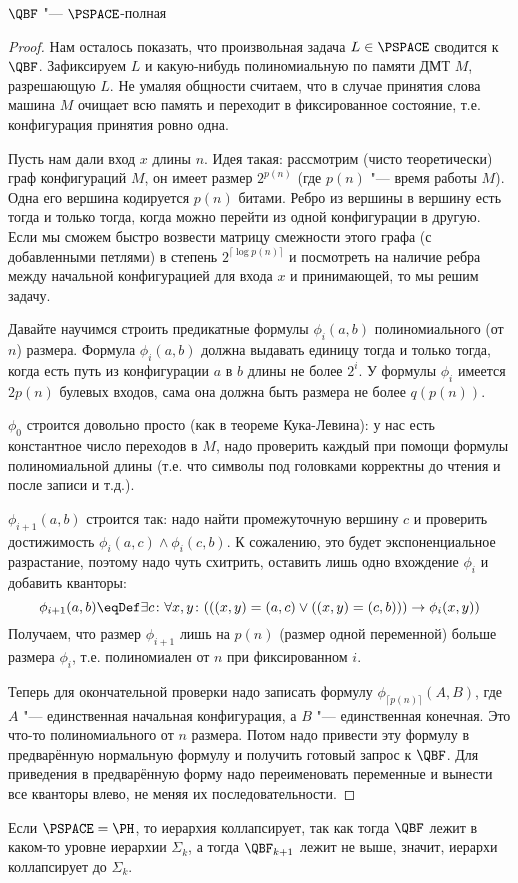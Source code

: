 	\begin{theorem}
		$\QBF$ "--- $\PSPACE$-полная
	\end{theorem}
	\begin{proof}
		Нам осталось показать, что произвольная задача $L \in \PSPACE$ сводится к $\QBF$.
		Зафиксируем $L$ и какую-нибудь полиномиальную по памяти ДМТ $M$, разрешающую $L$.
		Не умаляя общности считаем, что в случае принятия слова машина $M$ очищает всю память
		и переходит в фиксированное состояние, т.е. конфигурация принятия ровно одна.

		Пусть нам дали вход $x$ длины $n$.
		Идея такая: рассмотрим (чисто теоретически) граф конфигураций $M$, он имеет размер $2^{p(n)}$ (где $p(n)$ "--- время работы $M$).
		Одна его вершина кодируется $p(n)$ битами.
		Ребро из вершины в вершину есть тогда и только тогда, когда можно перейти из одной конфигурации в другую.
		Если мы сможем быстро возвести матрицу смежности этого графа (с добавленными петлями) в степень $2^{\lceil\log p(n)\rceil}$
		и посмотреть на наличие ребра между начальной конфигурацией для входа $x$ и принимающей, то мы решим задачу.

		Давайте научимся строить предикатные формулы $\phi_i(a, b)$ полиномиального (от $n$) размера.
		Формула $\phi_i(a, b)$ должна выдавать единицу тогда и только тогда, когда есть путь
		из конфигурации $a$ в $b$ длины не более $2^i$.
		У формулы $\phi_i$ имеется $2p(n)$ булевых входов, сама она должна быть размера не более $q(p(n))$.

		$\phi_0$ строится довольно просто (как в теореме Кука-Левина): у нас есть константное число переходов
		в $M$, надо проверить каждый при помощи формулы полиномиальной длины (т.е. что символы под головками корректны до чтения и после записи и т.д.).

		$\phi_{i+1}(a, b)$ строится так: надо найти промежуточную вершину $c$ и проверить
		достижимость $\phi_i(a, c) \land \phi_i(c, b)$.
		К сожалению, это будет экспоненциальное разрастание, поэтому надо чуть схитрить, оставить лишь одно вхождение $\phi_i$
		и добавить кванторы:
		\[ \phi_{i+1}(a, b) \eqDef \exists c \colon \forall x, y \colon (((x, y) = (a, c) \lor ((x, y) = (c, b))) \to \phi_i(x, y))\]
		Получаем, что размер $\phi_{i+1}$ лишь на $p(n)$ (размер одной переменной) больше размера $\phi_i$, т.е. полиномиален от $n$ при фиксированном $i$.

		Теперь для окончательной проверки надо записать формулу $\phi_{\lceil p(n) \rceil}(A, B)$,
		где $A$ "--- единственная начальная конфигурация, а $B$ "--- единственная конечная.
		Это что-то полиномиального от $n$ размера.
		Потом надо привести эту формулу в предварённую нормальную формулу и получить готовый запрос к $\QBF$.
		Для приведения в предварённую форму надо переименовать переменные и вынести все кванторы влево, не меняя их последовательности.
	\end{proof}
	\begin{conseq}
		Если $\PSPACE=\PH$, то иерархия коллапсирует, так как тогда $\QBF$ лежит в каком-то уровне иерархии $\Sigma_k$,
		а тогда $\QBF_{k+1}$ лежит не выше, значит, иерархи коллапсирует до $\Sigma_k$.
	\end{conseq}

